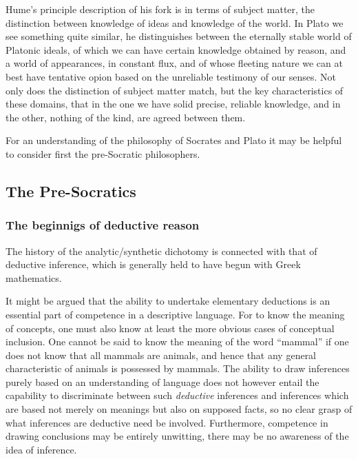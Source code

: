 Hume's principle description of his fork is in terms of subject
matter, the distinction between knowledge of ideas and knowledge of
the world. 
In Plato we see something quite similar, he distinguishes between the
eternally stable world of Platonic ideals, of which we can have
certain knowledge obtained by reason, and a world of appearances, in
constant flux, and of whose fleeting nature we can at best have
tentative opion based on the unreliable testimony of our senses.
Not only does the distinction of subject matter match, but the key
characteristics of these domains, that in the one we have solid
precise, reliable knowledge, and in the other, nothing of the kind,
are agreed between them.

For an understanding of the
philosophy of Socrates and Plato it may be helpful to consider first
the pre-Socratic philosophers.

\subsection{The Pre-Socratics}

\subsubsection{The beginnigs of deductive reason}

The history of the analytic/\-synthetic dichotomy is connected with that
of deductive inference, which is generally held to have begun with
Greek mathematics.

It might be argued that the ability to undertake elementary
deductions is an essential part of competence in a descriptive
language.
For to know the meaning of concepts, one must also know at least the
more obvious cases of conceptual inclusion.
One cannot be said to know the meaning of the word ``mammal'' if one
does not know that all mammals are animals, and hence that any general
characteristic of animals is possessed by mammals.
The ability to draw inferences purely based on an understanding of
language does not however entail the capability to discriminate
between such \emph{deductive} inferences and inferences which are
based not merely on meanings but also on supposed facts, so no clear
grasp of what inferences are deductive need be involved.
Furthermore, competence in drawing conclusions may be entirely
unwitting, there may be no awareness of the idea of inference.

